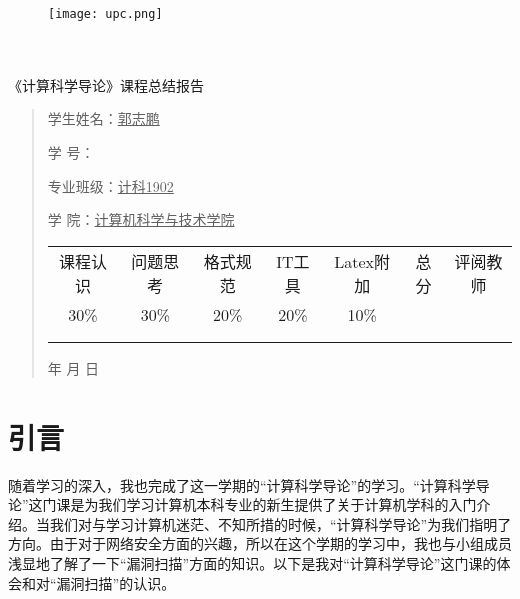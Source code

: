 \documentclass{article}
\renewcommand{\today}{\number\year 年 \number\month 月 \number\day 日}
\begin{document}
\begin{figure}
    \centering
    \texttt{[image: upc.png]}

    \label{figupc}
\end{figure}

	\begin{center}
		\quad \\
		\quad \\
		\heiti \fontsize{45}{17} \quad \quad \quad 
		\vskip 1.5cm
		\heiti {} 《计算科学导论》课程总结报告
	\end{center}
	\vskip 2.0cm
		
	\begin{quotation}
		\doublespacing
		
        \par\setlength\parindent{7em}
		\quad 

		学生姓名：\underline{\qquad  郭志鹏 \qquad \qquad}

		学\hspace{0.61cm} 号：\underline{\qquad}
		
		专业班级：\underline{\qquad 计科1902 \qquad  }
		
        学\hspace{0.61cm} 院：\underline{计算机科学与技术学院}
		\vskip 2cm
		\centering
		\begin{table}[h]
            \centering 
            \begin{tabular}{|c|c|c|c|c|c|c|}
                \hline
                课程认识 & 问题思 考 & 格式规范  & IT工具  & Latex附加  & 总分 & 评阅教师 \\
                30\% & 30\% & 20\% & 20\% & 10\% &  &  \\
                \hline
                 & & & & & &\\
                & & & & & &\\
                \hline
            \end{tabular}
        \end{table}
		\vskip 2cm
		\today
	\end{quotation}

\thispagestyle{empty}
\newpage
\setcounter{page}{1}
\section{引言}
随着学习的深入，我也完成了这一学期的“计算科学导论”的学习。“计算科学导论”这门课是为我们学习计算机本科专业的新生提供了关于计算机学科的入门介绍。当我们对与学习计算机迷茫、不知所措的时候，“计算科学导论”为我们指明了方向。由于对于网络安全方面的兴趣，所以在这个学期的学习中，我也与小组成员浅显地了解了一下“漏洞扫描”方面的知识。以下是我对“计算科学导论”这门课的体会和对“漏洞扫描”的认识。
\end{document}
